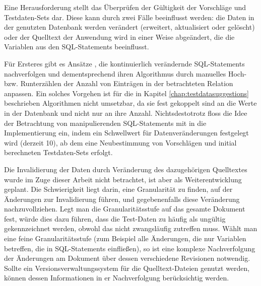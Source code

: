 Eine Herausforderung stellt das Überprüfen der Gültigkeit der Vorschläge und Testdaten-Sets dar.
Diese kann durch zwei Fälle beeinflusst werden: die Daten in der genutzten Datenbank werden verändert (erweitert, aktualisiert oder gelöscht) oder der Quelltext der Anwendung wird in einer Weise abgeändert, die die Variablen aus den SQL-Statements beeinflusst.

Für Ersteres gibt es Ansätze \cite{DBLP:conf/dasfaa/HarangsriSN97}, die kontinuierlich verändernde SQL-Statements nachverfolgen und dementsprechend ihren Algorithmus durch manuelles Hoch- bzw. Runterzählen der Anzahl von Einträgen in der betrachteten Relation anpassen.
Ein solches Vorgehen ist für die in Kapitel \ref{chap:testdatasuggestions} beschrieben Algorithmen nicht umsetzbar, da sie fest gekoppelt sind an die Werte in der Datenbank und nicht nur an ihre Anzahl.
Nichtsdestotrotz floss die Idee der Betrachtung von manipulierenden SQL-Statements mit in die Implementierung ein, indem ein Schwellwert für Datenveränderungen festgelegt wird (derzeit 10), ab dem eine Neubestimmung von Vorschlägen und initial berechneten Testdaten-Sets erfolgt.

Die Invalidierung der Daten durch Veränderung des dazugehörigen Quelltextes wurde im Zuge dieser Arbeit nicht betrachtet, ist aber als Weiterentwicklung geplant.
Die Schwierigkeit liegt darin, eine Granularität zu finden, auf der Änderungen zur Invalidierung führen, und gegebenenfalls diese Veränderung nachzuvollziehen.
Legt man die Granularitätsstufe auf das gesamte Dokument fest, würde dies dazu führen, dass die Test-Daten zu häufig als ungültig gekennzeichnet werden, obwohl das nicht zwangsläufig zutreffen muss.
Wählt man eine feine Granularitätsstufe (zum Beispiel alle Änderungen, die nur Variablen betreffen, die in SQL-Statements einfließen), so ist eine komplexe Nachverfolgung der Änderungen am Dokument über dessen verschiedene Revisionen notwendig.
Sollte ein Versionsverwaltungssystem für die Quelltext-Dateien genutzt werden, können dessen Informationen in er Nachverfolgung berücksichtig werden.

